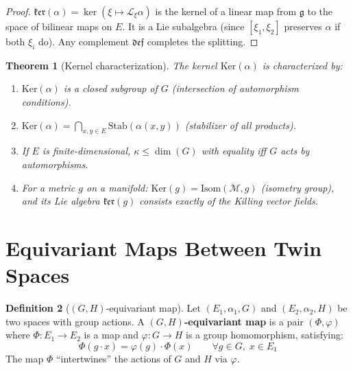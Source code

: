 \documentclass[12pt]{article}
\theoremstyle{plain}
\newtheorem{theorem}{Theorem}[section]
\theoremstyle{definition}
\newtheorem{definition}[theorem]{Definition}
\theoremstyle{remark}
\newcommand{\Ker}{\mathrm{Ker}}
\newcommand{\Isom}{\mathrm{Isom}}
\begin{document}
\begin{proof}
$\mathfrak{ker}(\alpha) = \ker(\xi \mapsto \mathcal{L}_\xi\alpha)$ is the kernel of a linear map from $\mathfrak{g}$ to the space of bilinear maps on $E$. It is a Lie subalgebra (since $[\xi_1, \xi_2]$ preserves $\alpha$ if both $\xi_i$ do). Any complement $\mathfrak{def}$ completes the splitting.
\end{proof}

\begin{theorem}[Kernel characterization]\label{thm:kernel-char}
The kernel $\Ker(\alpha)$ is characterized by:
\begin{enumerate}[label=(\alph*)]
    \item $\Ker(\alpha)$ is a closed subgroup of $G$ (intersection of automorphism conditions).
    \item $\Ker(\alpha) = \bigcap_{x,y \in E} \mathrm{Stab}(\alpha(x,y))$ (stabilizer of all products).
    \item If $E$ is finite-dimensional, $\kappa \leq \dim(G)$ with equality iff $G$ acts by automorphisms.
    \item For a metric $g$ on a manifold: $\Ker(g) = \Isom(\mathcal{M}, g)$ (isometry group), and its Lie algebra $\mathfrak{ker}(g)$ consists exactly of the Killing vector fields.
\end{enumerate}
\end{theorem}


\section{Equivariant Maps Between Twin Spaces}
\label{sec:equivariant}

\begin{definition}[$(G,H)$-equivariant map]\label{def:equivariant}
Let $(E_1, \alpha_1, G)$ and $(E_2, \alpha_2, H)$ be two spaces with group actions. A \textbf{$(G,H)$-equivariant map} is a pair $(\Phi, \varphi)$ where $\Phi: E_1 \to E_2$ is a map and $\varphi: G \to H$ is a group homomorphism, satisfying:
\begin{equation}\label{eq:equivariant}
\boxed{\Phi(g \cdot x) = \varphi(g) \cdot \Phi(x) \qquad \forall g \in G,\; x \in E_1}
\end{equation}
The map $\Phi$ ``intertwines'' the actions of $G$ and $H$ via $\varphi$.
\end{definition}
\end{document}
